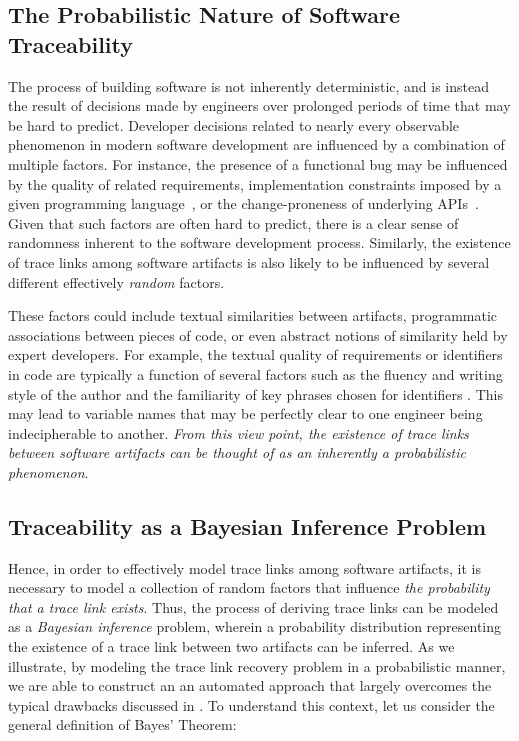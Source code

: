 \subsection{The Probabilistic Nature of Software Traceability}
The process of building software is not inherently deterministic, and is instead the result of decisions made by engineers over prolonged periods of time that may be hard to predict. Developer decisions related to nearly every observable phenomenon in modern software development are influenced by a combination of multiple factors. For instance, the presence of a functional bug may be influenced by the quality of related requirements, implementation constraints imposed by a given programming language~\citep{Ray:CACM'17}, or the change-proneness of underlying APIs~\citep{Linares-Vasquez:FSE'13}. Given that such factors are often hard to predict, there is a clear sense of randomness inherent to the software development process. Similarly, the existence of trace links among software artifacts is also likely to be influenced by several different effectively \textit{random} factors.  

These factors could include textual similarities between artifacts, programmatic associations between pieces of code, or even abstract notions of similarity held by expert developers.  For example, the textual quality of requirements or identifiers in code are typically a function of several factors such as the fluency and writing style of the author and the familiarity of key phrases chosen for identifiers \citep{Dasgupta:ICSME'13}. This may lead to variable names that may be perfectly clear to one engineer being indecipherable to another.  \textit{From this view point, the existence of trace links between software artifacts can be thought of as an inherently a probabilistic phenomenon}.

\subsection{Traceability as a Bayesian Inference Problem}

Hence, in order to effectively model trace links among software artifacts, it is necessary to model a collection of random factors that influence \textit{the probability that a trace link exists}. Thus, the process of deriving trace links can be modeled as a \textit{Bayesian inference} problem, wherein a probability distribution representing the existence of a trace link between two artifacts can be inferred. As we illustrate, by modeling the trace link recovery problem in a probabilistic manner, we are able to construct an an automated approach that largely overcomes the typical drawbacks discussed in  . To understand this context, let us consider the general definition of Bayes' Theorem:

